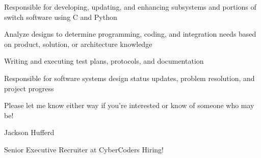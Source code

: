 Responsible for developing, updating, and enhancing subsystems and portions of switch software using C and Python

Analyze designs to determine programming, coding, and integration needs based on product, solution, or architecture knowledge

Writing and executing test plans, protocols, and documentation

Responsible for software systems design status updates, problem resolution, and project progress

Please let me know either way if you're interested or know of someone who may be!

Jackson Hufferd

Senior Executive Recruiter at CyberCoders\- Hiring!

\bye
